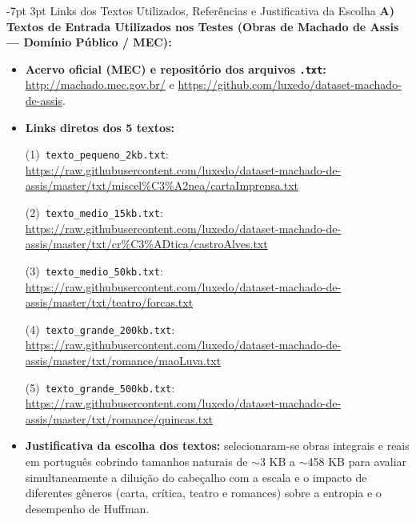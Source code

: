 \documentclass[a4paper,10pt]{article}
\makeatletter
\renewcommand\section{\@startsection {section}{1}{\z@}%
                                   {-7pt \@plus -2pt \@minus -1pt}%
                                   {3pt \@plus 1pt}%
                                   {\normalfont\large\bfseries}}
\makeatother
\begin{document}
\section{Links dos Textos Utilizados, Referências e Justificativa da Escolha}
\textbf{A) Textos de Entrada Utilizados nos Testes (Obras de Machado de Assis --- Domínio Público / MEC):}
\begin{itemize}\setlength{\itemsep}{1pt}\setlength{\parskip}{0pt}\setlength{\topsep}{2pt}
  \item \textbf{Acervo oficial (MEC) e repositório dos arquivos \texttt{.txt}:} \url{http://machado.mec.gov.br/} e \url{https://github.com/luxedo/dataset-machado-de-assis}.
  \item \textbf{Links diretos dos 5 textos:}\par
    {\scriptsize
    (1)~\texttt{texto\_pequeno\_2kb.txt}: \url{https://raw.githubusercontent.com/luxedo/dataset-machado-de-assis/master/txt/miscel%C3%A2nea/cartaImprensa.txt}\par
    (2)~\texttt{texto\_medio\_15kb.txt}: \url{https://raw.githubusercontent.com/luxedo/dataset-machado-de-assis/master/txt/cr%C3%ADtica/castroAlves.txt}\par
    (3)~\texttt{texto\_medio\_50kb.txt}: \url{https://raw.githubusercontent.com/luxedo/dataset-machado-de-assis/master/txt/teatro/forcas.txt}\par
    (4)~\texttt{texto\_grande\_200kb.txt}: \url{https://raw.githubusercontent.com/luxedo/dataset-machado-de-assis/master/txt/romance/maoLuva.txt}\par
    (5)~\texttt{texto\_grande\_500kb.txt}: \url{https://raw.githubusercontent.com/luxedo/dataset-machado-de-assis/master/txt/romance/quincas.txt}}
  \item \textbf{Justificativa da escolha dos textos:} selecionaram-se obras integrais e reais em português cobrindo tamanhos naturais de $\sim$3 KB a $\sim$458 KB para avaliar simultaneamente a diluição do cabeçalho com a escala e o impacto de diferentes gêneros (carta, crítica, teatro e romances) sobre a entropia e o desempenho de Huffman.
\end{itemize}
\end{document}
